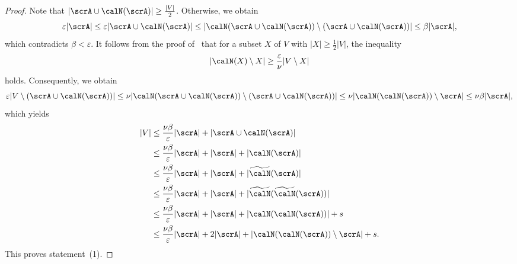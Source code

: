 \begin{proof}
Note that $|\scrA \cup \calN(\scrA)| \geq \frac{|V|}{2}$. Otherwise, we obtain 
$$\varepsilon |\scrA| 
\leq 
\varepsilon |\scrA \cup \calN(\scrA)|
\leq 
|\calN( \scrA \cup \calN(\scrA)) \setminus (\scrA \cup \calN(\scrA))| 
\leq \beta |\scrA|,$$
which contradicts $\beta < \varepsilon$. It follows from the proof of~\cite[Proposition 2.7]{CheegerCayleySum} that for a subset $X$ of $V$ with $|X|\geq \frac 12 |V|$, the inequality 
$$|\calN(X) \setminus X| \geq \frac \varepsilon \nu |V \setminus X|$$
holds. Consequently, we obtain 
$$
\varepsilon|V \setminus (\scrA \cup \calN(\scrA))| 
\leq \nu |\calN(\scrA \cup \calN(\scrA)) \setminus (\scrA \cup \calN(\scrA))|
 \leq \nu |\calN(\calN(\scrA))\setminus \scrA| 
 \leq \nu \beta |\scrA|,$$
which yields 
\begin{align*}
|V| 
& \leq \frac{\nu\beta}{\varepsilon}|\scrA| + |\scrA \cup \calN(\scrA)|\\
& \leq \frac{\nu\beta}{\varepsilon}|\scrA| + |\scrA| + |\calN(\scrA)| \\
&\leq \frac{\nu\beta}{\varepsilon}|\scrA| + |\scrA| + |\widetilde \calN(\scrA)| \\
& \leq \frac{\nu\beta}{\varepsilon}|\scrA| + |\scrA| + |\widetilde \calN( \widetilde \calN(\scrA))| \\
& \leq \frac{\nu\beta}{\varepsilon}|\scrA| + |\scrA| + |\calN( \calN(\scrA))| + s \\
& \leq \frac{\nu\beta}{\varepsilon}|\scrA| + 2|\scrA| + |\calN(\calN(\scrA))\setminus \scrA| + s.
\end{align*}
This proves statement~(1).


\end{proof}
